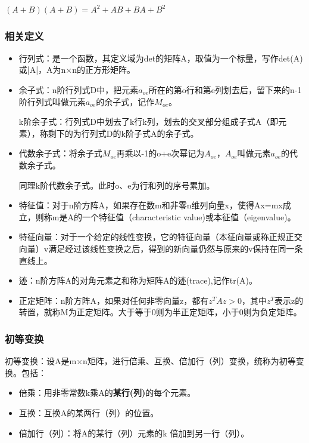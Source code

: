 \documentclass[UTF8]{article}%
\begin{document}
$(A+B)(A+B)=A^2+AB+BA+B^2$

\subsubsection{相关定义}

\begin{itemize}
    \item 行列式：是一个函数，其定义域为det的矩阵A，取值为一个标量，写作det(A)或|A|，A为n×n的正方形矩阵。
    \item 余子式：n阶行列式D中，把元素$a_{oe}$所在的第o行和第e列划去后，留下来的n-1阶行列式叫做元素$a_{oe}$的余子式，记作$M_{oe}$。
    
    k阶余子式：行列式D中划去了k行k列，划去的交叉部分组成子式A（即元素），称剩下的为行列式D的k阶子式A的余子式。

    \item 代数余子式：将余子式$M_{oe}$再乘以-1的o+e次幂记为$A_{oe}$，$A_{oe}$叫做元素$a_{oe}$的代数余子式。
    
    同理k阶代数余子式。此时o、e为行和列的序号累加。
   
    \item 特征值：对于n阶方阵A，如果存在数m和非零n维列向量x，使得Ax=mx成立，则称m是A的一个特征值（characteristic value)或本征值（eigenvalue)。
    \item 特征向量：对于一个给定的线性变换，它的特征向量（本征向量或称正规正交向量）v满足经过该线性变换之后，得到的新向量仍然与原来的v保持在同一条直线上。
    \item 迹：n阶方阵A的对角元素之和称为矩阵A的迹(trace),记作tr(A)。
    \item 正定矩阵：n阶方阵A，如果对任何非零向量z，都有$z^TAz>0$，其中$z^T$表示z的转置，就称M为正定矩阵。大于等于0则为半正定矩阵，小于0则为负定矩阵。
\end{itemize}

\subsubsection{初等变换}

初等变换：设A是m×n矩阵，进行倍乘、互换、倍加行（列）变换，统称为初等变换。包括：

\begin{itemize}
    \item 倍乘：用非零常数k乘A的\textbf{某行(列)}的每个元素。
    \item 互换：互换A的某两行（列）的位置。
    \item 倍加行（列）：将A的某行（列）元素的k 倍加到另一行（列）。
\end{itemize}
\end{document}
